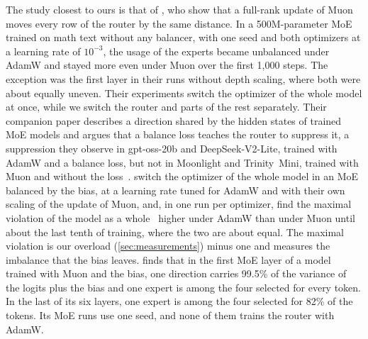 \documentclass[11pt, a4paper]{article}
\begin{document}
The study closest to ours is that of \citet{wang2026depth}, who show that a full-rank update of Muon moves every row of the router by the same distance. In a 500M-parameter MoE trained on math text without any balancer, with one seed and both optimizers at a learning rate of $10^{-3}$, the usage of the experts became unbalanced under AdamW and stayed more even under Muon over the first 1,000 steps. The exception was the first layer in their runs without depth scaling, where both were about equally uneven. Their experiments switch the optimizer of the whole model at once, while we switch the router and parts of the rest separately. Their companion paper describes a direction shared by the hidden states of trained MoE models and argues that a balance loss teaches the router to suppress it, a suppression they observe in gpt-oss-20b and DeepSeek-V2-Lite, trained with AdamW and a balance loss, but not in Moonlight and Trinity~Mini, trained with Muon and without the loss~\citep{wang2026myth}. \citet{xie2026spectralsphere} switch the optimizer of the whole model in an MoE balanced by the bias, at a learning rate tuned for AdamW and with their own scaling of the update of Muon, and, in one run per optimizer, find the maximal violation of the model as a whole~\citep{wang2024lossfree} higher under AdamW than under Muon until about the last tenth of training, where the two are about equal. The maximal violation is our overload (\cref{sec:measurements}) minus one and measures the imbalance that the bias leaves. \citet{li2026spectralcap} finds that in the first MoE layer of a model trained with Muon and the bias, one direction carries 99.5\% of the variance of the logits plus the bias and one expert is among the four selected for every token. In the last of its six layers, one expert is among the four selected for 82\% of the tokens. Its MoE runs use one seed, and none of them trains the router with AdamW\@.
\end{document}
